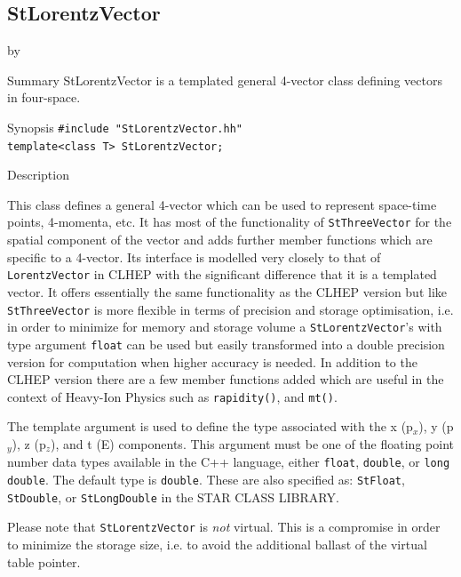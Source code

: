 \documentclass[twoside]{article}
\newcommand{\comp}[1]{\texttt{#1}}%
\newcommand{\entrylabel}[1]{\mbox{\textbf{{#1}}}\hfil}%
\newenvironment{entry}
{\begin{list}{}%
    {\renewcommand{\makelabel}{\entrylabel}%
     \setlength{\labelwidth}{90pt}%
     \setlength{\leftmargin}{\labelwidth}
     \advance\leftmargin by \labelsep%
      }%
    }%
  {\end{list}}
\newcommand{\Entrylabel}[1]%
{\raisebox{0pt}[1ex][0pt]{\makebox[\labelwidth][l]%
    {\parbox[t]{\labelwidth}{\hspace{0pt}\textbf{{#1}}}}}}
\newenvironment{Entry}%
{\renewcommand{\entrylabel}{\Entrylabel}\begin{entry}}%
  {\end{entry}}
\begin{document}
\subsection{StLorentzVector } \label{StLorentzVector}
\begin{Entry}
\item[Summary]
    StLorentzVector is a templated general 4-vector class defining
    vectors in four-space.

\item[Synopsis]
    \verb+#include "StLorentzVector.hh"+ \\
    \verb+template<class T> StLorentzVector;+
    
    
\item[Description]   
    
    This class defines a general 4-vector which can be used to
    represent space-time points, 4-momenta, etc.  It has most of the
    functionality of \comp{StThreeVector} for the spatial component
    of the vector and adds further member functions which are specific
    to a 4-vector.  Its interface is modelled very closely to that of
    \comp{LorentzVector} in CLHEP  with the significant
    difference that it is a templated vector.
    It offers essentially the
    same functionality as the CLHEP version but like \comp{StThreeVector}
    is more flexible in terms of precision and storage optimisation, i.e.
    in order to minimize for memory and storage volume a \comp{StLorentzVector}'s
    with type argument \comp{float} can be used but easily
    transformed into a double precision version for computation when
    higher accuracy is needed.  In addition to the CLHEP version there
    are a few member functions added which are useful in the context
    of Heavy-Ion Physics such as \comp{rapidity()}, and \comp{mt()}.
    
    The template argument is used to define the type associated with
    the x (p$_{x}$), y (p$_{y}$), z (p$_{z}$), and t (E) components.
    This argument must be one of the floating
    point number data types available in the C++ language, either
    \comp{float}, \comp{double}, or \comp{long double}. The
    default type is \comp{double}.  These are also specified as:
    \comp{StFloat}, \comp{StDouble}, or \comp{StLongDouble} in
    the STAR CLASS LIBRARY.
    
    Please note that \comp{StLorentzVector} is {\em not} virtual. This
    is a compromise in order to minimize the storage size, i.e. to
    avoid the additional ballast of the virtual table pointer.


\end{Entry}
\end{document}

